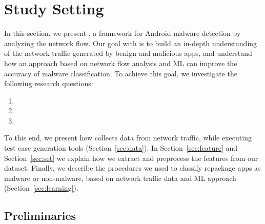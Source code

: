 \section{Study Setting}\label{sec:Methodology}


In this section, we present \droidxpflow, a framework for Android malware detection by analyzing the network flow. Our goal with \droidxpflow is to build an in-depth understanding of the network traffic generated by benign and malicious apps, and understand how an approach based on network flow analysis and ML can improve the accuracy of malware classification. To achieve this goal, we investigate the following research questions:


\begin{enumerate}[(RQ1)]
\item \rqa
\item \rqb
\item \rqc
\end{enumerate}

To this end, we present how \droidxpflow collects data from network traffic, while executing test case generation tools (Section~\ref{sec:data}). In Section~\ref{sec:feature} and Section~\ref{sec:set} we explain how we extract and preprocess the features from our dataset. Finally, we describe the procedures we used to classify repackage apps as malware or non-malware, based on network traffic data and ML approach (Section~\ref{sec:learning}).

\subsection{Preliminaries}\label{sec:dataset}


